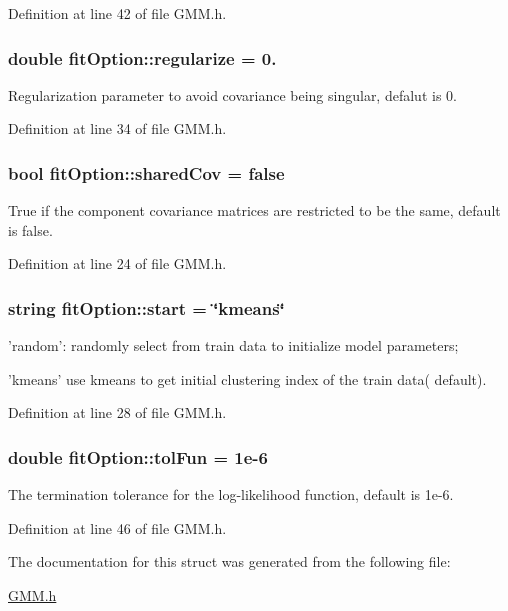 Definition at line 42 of file G\+M\+M.\+h.

\hypertarget{structfit_option_abffa02537679becf07413b31f5889e6f}{
\subsubsection[{regularize}]{\setlength{\rightskip}{0pt plus 5cm}double fit\+Option\+::regularize = 0.}}\label{structfit_option_abffa02537679becf07413b31f5889e6f}
Regularization parameter to avoid covariance being singular, defalut is 0. 

Definition at line 34 of file G\+M\+M.\+h.

\hypertarget{structfit_option_a2efaf3629539e3864967853058e80420}{
\subsubsection[{shared\+Cov}]{\setlength{\rightskip}{0pt plus 5cm}bool fit\+Option\+::shared\+Cov = false}}\label{structfit_option_a2efaf3629539e3864967853058e80420}
True if the component covariance matrices are restricted to be the same, default is false. 

Definition at line 24 of file G\+M\+M.\+h.

\hypertarget{structfit_option_a4c1ecd5ba984e2e12faa29217c78f931}{
\subsubsection[{start}]{\setlength{\rightskip}{0pt plus 5cm}string fit\+Option\+::start = \char`\"{}kmeans\char`\"{}}}\label{structfit_option_a4c1ecd5ba984e2e12faa29217c78f931}
'random'\+: randomly select from train data to initialize model parameters;

'kmeans' use kmeans to get initial clustering index of the train data( default). 

Definition at line 28 of file G\+M\+M.\+h.

\hypertarget{structfit_option_a4523efadc5bc4f29cd1648ac4ca018dd}{
\subsubsection[{tol\+Fun}]{\setlength{\rightskip}{0pt plus 5cm}double fit\+Option\+::tol\+Fun = 1e-\/6}}\label{structfit_option_a4523efadc5bc4f29cd1648ac4ca018dd}
The termination tolerance for the log-\/likelihood function, default is 1e-\/6. 

Definition at line 46 of file G\+M\+M.\+h.



The documentation for this struct was generated from the following file\+:\begin{DoxyCompactItemize}
\item 
\hyperlink{_g_m_m_8h}{G\+M\+M.\+h}\end{DoxyCompactItemize}
